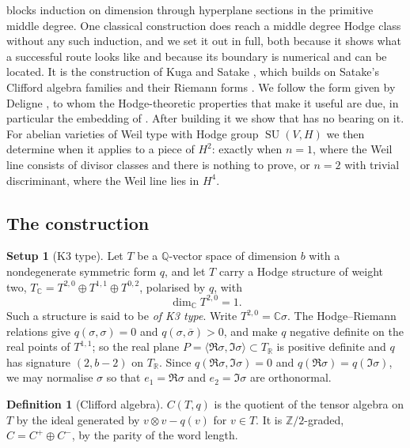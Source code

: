 \documentclass[11pt,reqno]{amsart}
\theoremstyle{plain}
\theoremstyle{definition}
\newtheorem{definition}[theorem]{Definition}
\newtheorem{setupenv}[theorem]{Setup}
\theoremstyle{remark}
\newcommand{\QQ}{\mathbb{Q}}
\newcommand{\ZZ}{\mathbb{Z}}
\newcommand{\RR}{\mathbb{R}}
\newcommand{\CC}{\mathbb{C}}
\DeclareMathOperator{\SU}{SU}
\newcommand{\bbar}[1]{\overline{#1}}
\begin{document}
 blocks induction on dimension through hyperplane
sections in the primitive middle degree. One classical construction does reach
a middle degree Hodge class without any such induction, and we set it out in
full, both because it shows what a successful route looks like and because
its boundary is numerical and can be located. It is the construction of Kuga
and Satake \cite{KS67}, which builds on Satake's Clifford algebra families and
their Riemann forms \cite{Sat66}. We follow the form given by Deligne
\cite{Del72}, to whom the Hodge-theoretic properties that make it useful are
due, in particular the embedding of . After building it we
show that  has no bearing on it. For abelian varieties of
Weil type with Hodge group $\SU(V,H)$ we then determine when it applies to a
piece of $H^{2}$: exactly when $n=1$, where the Weil line consists of divisor
classes and there is nothing to prove, or $n=2$ with trivial discriminant,
where the Weil line lies in $H^{4}$.

\subsection{The construction}

\begin{setupenv}[K3 type]\label{setup:k3type}
Let $T$ be a $\QQ$-vector space of dimension $b$ with a nondegenerate
symmetric form $q$, and let $T$ carry a Hodge structure of weight two,
$T_{\CC}=T^{2,0}\oplus T^{1,1}\oplus T^{0,2}$, polarised by $q$, with
\[
  \dim_{\CC}T^{2,0}=1 .
\]
Such a structure is said to be \emph{of K3 type}. Write $T^{2,0}=\CC\sigma$.
The Hodge--Riemann relations give $q(\sigma,\sigma)=0$ and
$q(\sigma,\bbar{\sigma})>0$, and make $q$ negative definite on the real points
of $T^{1,1}$; so the real plane
$P=\langle\Re\sigma,\Im\sigma\rangle\subset T_{\RR}$ is positive definite and
$q$ has signature $(2,b-2)$ on $T_{\RR}$. Since $q(\Re\sigma,\Im\sigma)=0$
and $q(\Re\sigma)=q(\Im\sigma)$, we may normalise $\sigma$ so that
$e_{1}=\Re\sigma$ and $e_{2}=\Im\sigma$ are orthonormal.
\end{setupenv}

\begin{definition}[Clifford algebra]\label{def:clifford}
$C(T,q)$ is the quotient of the tensor algebra on $T$ by the ideal generated
by $v\otimes v-q(v)$ for $v\in T$. It is $\ZZ/2$-graded, $C=C^{+}\oplus C^{-}$,
by the parity of the word length.
\end{definition}
\end{document}
